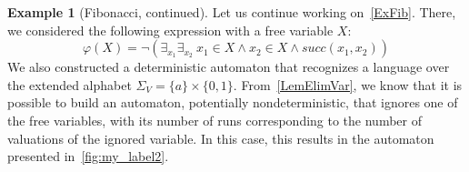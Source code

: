 \documentclass[en]{pracamgr}
\theoremstyle{definition}
\newtheorem{example}{Example}[section]
\begin{document}

\begin{example}[Fibonacci, continued]
\label{ExFibCont}
    Let us continue working on~\cref{ExFib}. There, we considered the following expression with a free variable $X$:
    $$\varphi(X) = \neg(\exists_{x_1}\exists_{x_2} \ x_1 \in X \land x_2 \in X \land succ(x_1, x_2))$$
    We also constructed a deterministic automaton that recognizes a language over the extended alphabet $\Sigma_V = \{a\} \times \{0,1\}$. From~\cref{LemElimVar}, we know that it is possible to build an automaton, potentially nondeterministic, that ignores one of the free variables, with its number of runs corresponding to the number of valuations of the ignored variable. In this case, this results in the automaton presented in~\cref{fig:my_label2}.



\end{example}
\end{document}
